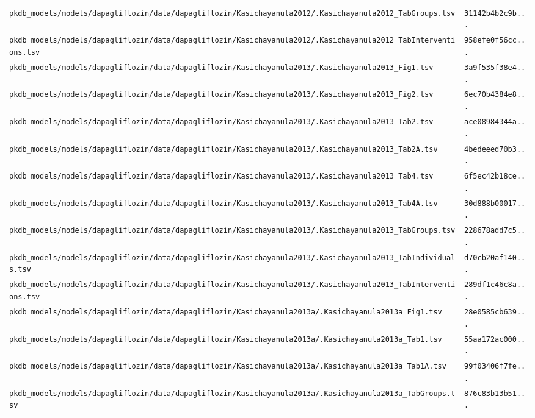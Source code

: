 \begin{longtable}{ll}
\texttt{pkdb\_models/models/dapagliflozin/data/dapagliflozin/Kasichayanula2012/.Kasichayanula2012\_TabGroups.tsv} & \texttt{31142b4b2c9b...} \\
\texttt{pkdb\_models/models/dapagliflozin/data/dapagliflozin/Kasichayanula2012/.Kasichayanula2012\_TabInterventions.tsv} & \texttt{958efe0f56cc...} \\
\texttt{pkdb\_models/models/dapagliflozin/data/dapagliflozin/Kasichayanula2013/.Kasichayanula2013\_Fig1.tsv} & \texttt{3a9f535f38e4...} \\
\texttt{pkdb\_models/models/dapagliflozin/data/dapagliflozin/Kasichayanula2013/.Kasichayanula2013\_Fig2.tsv} & \texttt{6ec70b4384e8...} \\
\texttt{pkdb\_models/models/dapagliflozin/data/dapagliflozin/Kasichayanula2013/.Kasichayanula2013\_Tab2.tsv} & \texttt{ace08984344a...} \\
\texttt{pkdb\_models/models/dapagliflozin/data/dapagliflozin/Kasichayanula2013/.Kasichayanula2013\_Tab2A.tsv} & \texttt{4bedeeed70b3...} \\
\texttt{pkdb\_models/models/dapagliflozin/data/dapagliflozin/Kasichayanula2013/.Kasichayanula2013\_Tab4.tsv} & \texttt{6f5ec42b18ce...} \\
\texttt{pkdb\_models/models/dapagliflozin/data/dapagliflozin/Kasichayanula2013/.Kasichayanula2013\_Tab4A.tsv} & \texttt{30d888b00017...} \\
\texttt{pkdb\_models/models/dapagliflozin/data/dapagliflozin/Kasichayanula2013/.Kasichayanula2013\_TabGroups.tsv} & \texttt{228678add7c5...} \\
\texttt{pkdb\_models/models/dapagliflozin/data/dapagliflozin/Kasichayanula2013/.Kasichayanula2013\_TabIndividuals.tsv} & \texttt{d70cb20af140...} \\
\texttt{pkdb\_models/models/dapagliflozin/data/dapagliflozin/Kasichayanula2013/.Kasichayanula2013\_TabInterventions.tsv} & \texttt{289df1c46c8a...} \\
\texttt{pkdb\_models/models/dapagliflozin/data/dapagliflozin/Kasichayanula2013a/.Kasichayanula2013a\_Fig1.tsv} & \texttt{28e0585cb639...} \\
\texttt{pkdb\_models/models/dapagliflozin/data/dapagliflozin/Kasichayanula2013a/.Kasichayanula2013a\_Tab1.tsv} & \texttt{55aa172ac000...} \\
\texttt{pkdb\_models/models/dapagliflozin/data/dapagliflozin/Kasichayanula2013a/.Kasichayanula2013a\_Tab1A.tsv} & \texttt{99f03406f7fe...} \\
\texttt{pkdb\_models/models/dapagliflozin/data/dapagliflozin/Kasichayanula2013a/.Kasichayanula2013a\_TabGroups.tsv} & \texttt{876c83b13b51...} \\

\end{longtable}
